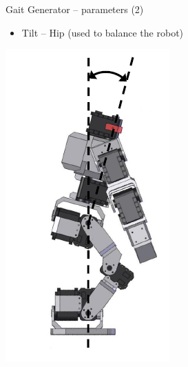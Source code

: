 \documentclass[compress]{beamer}
\begin{document}
\begin{frame}{Gait Generator -- parameters (2)}

    \begin{itemize}

        \item Tilt -- Hip (used to balance the robot)
    \end{itemize}
    \begin{center}
        \includegraphics[height=0.5\paperheight]{bioloid-gait-2}
    \end{center}

\end{frame}
\end{document}
